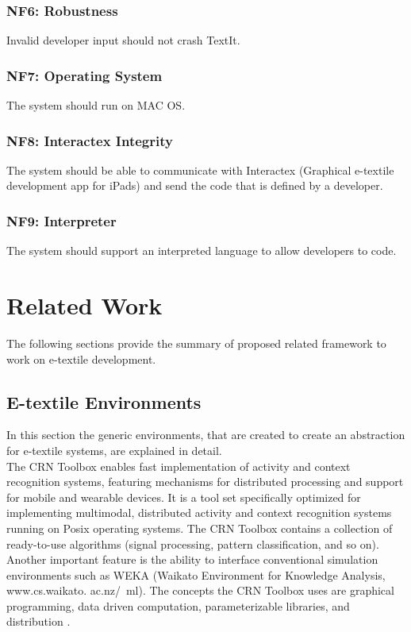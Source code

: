 \subsubsection{NF6: Robustness}
Invalid developer input should not crash TextIt.

\subsubsection{NF7: Operating System}
The system should run on MAC OS. 

\subsubsection{NF8: Interactex Integrity}
The system should be able to communicate with Interactex (Graphical e-textile development app for iPads) and send the code that is defined by a developer.

\subsubsection{NF9: Interpreter}
The system should support an interpreted language to allow developers to code. 

\section{Related Work}

The following sections provide the summary of proposed related framework to work on e-textile development.

\subsection{E-textile Environments}

In this section the generic environments, that are created to create an abstraction for e-textile systems, are explained in detail. \\ 

The CRN Toolbox enables fast implementation of activity and context recognition systems, featuring mechanisms for distributed processing and support for mobile and wearable devices. It is a tool set specifically optimized for implementing multimodal, distributed activity and context recognition systems running on Posix operating systems. The CRN Toolbox contains a collection of ready-to-use algorithms (signal processing, pattern classification, and so on). Another important feature is the ability to interface conventional simulation environments such as WEKA (Waikato Environment for Knowledge Analysis, www.cs.waikato. ac.nz/~ml). The concepts the CRN Toolbox uses are graphical programming, data driven computation, parameterizable libraries, and distribution \cite{8}. \\

